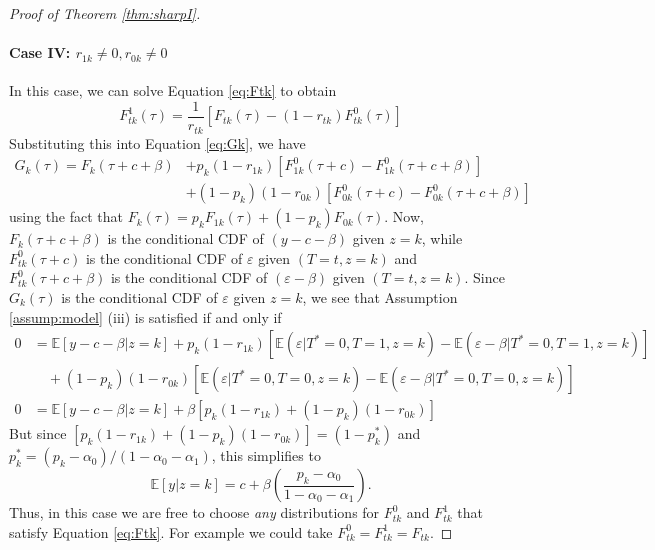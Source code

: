 \begin{proof}[Proof of Theorem \ref{thm:sharpI}]
\paragraph{Case IV: $r_{1k}\neq 0, r_{0k} \neq 0$}
In this case, we can solve Equation \ref{eq:Ftk} to obtain
\[
  F^1_{tk}(\tau) = \frac{1}{r_{tk}}\left[F_{tk}(\tau) - (1 - r_{tk})F^0_{tk}(\tau)\right]
\]
Substituting this into Equation \ref{eq:Gk}, we have
\begin{align*}
  G_k(\tau) = F_k(\tau + c + \beta) &+ p_k(1 - r_{1k})\left[F^0_{1k}(\tau + c) - F_{1k}^0(\tau + c + \beta)\right]\\
  &+ (1 - p_k)(1 - r_{0k}) \left[ F^0_{0k}(\tau + c) - F^0_{0k}(\tau + c + \beta) \right]
\end{align*}
using the fact that $F_k(\tau) = p_k F_{1k}(\tau) + (1 - p_k) F_{0k}(\tau)$.
Now, $F_k(\tau + c + \beta)$ is the conditional CDF of $(y - c - \beta)$ given $z=k$, while $F_{tk}^0(\tau + c)$ is the conditional CDF of $\varepsilon$ given $(T = t,z =k)$ and $F^0_{tk}(\tau + c + \beta)$ is the conditional CDF of $(\varepsilon - \beta)$ given $(T = t, z=k)$.
Since $G_k(\tau)$ is the conditional CDF of $\varepsilon$ given $z=k$, we see that Assumption \ref{assump:model} (iii) is satisfied if and only if
\begin{align*}
  0 &= \mathbb{E}[y - c - \beta|z=k] + p_k(1 - r_{1k})\left[ \mathbb{E}(\varepsilon|T^*=0,T=1,z=k) - \mathbb{E}(\varepsilon - \beta|T^*=0,T=1,z=k) \right] \\
   &\quad + (1 - p_k)(1 - r_{0k})\left[ \mathbb{E}(\varepsilon|T^*=0,T=0,z=k) - \mathbb{E}(\varepsilon - \beta|T^*=0,T=0,z=k) \right]\\
   0 &= \mathbb{E}[y - c - \beta|z=k] + \beta\left[p_k(1 - r_{1k}) + (1 - p_k)(1 - r_{0k})\right]
\end{align*}
But since $\left[p_k(1 - r_{1k}) + (1 - p_k)(1 - r_{0k})\right] = (1 - p_k^*)$ and $p_k^* = (p_k - \alpha_0) /(1 - \alpha_0 - \alpha_1)$, this simplifies to 
\[
\mathbb{E}[y|z=k] = c + \beta\left( \frac{p_k - \alpha_0}{1 - \alpha_0 - \alpha_1} \right).
\]
Thus, in this case we are free to choose \emph{any} distributions for $F^{0}_{tk}$ and $F^1_{tk}$ that satisfy Equation \ref{eq:Ftk}.
For example we could take $F^0_{tk} = F^1_{tk} = F_{tk}$.
\end{proof}


